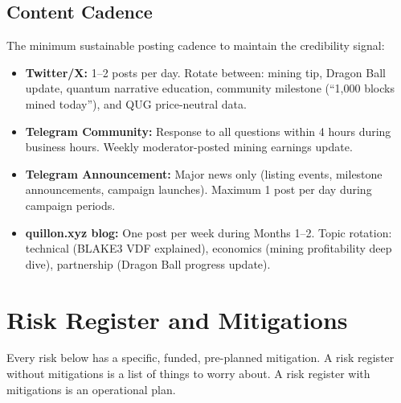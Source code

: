 \documentclass[11pt,a4paper]{article}
\begin{document}
\subsection{Content Cadence}

The minimum sustainable posting cadence to maintain the credibility signal:

\begin{itemize}[leftmargin=1.5em, itemsep=2pt]
  \item \textbf{Twitter/X:} 1--2 posts per day. Rotate between: mining tip, Dragon Ball update, quantum narrative education, community milestone (``1,000 blocks mined today''), and QUG price-neutral data.
  \item \textbf{Telegram Community:} Response to all questions within 4 hours during business hours. Weekly moderator-posted mining earnings update.
  \item \textbf{Telegram Announcement:} Major news only (listing events, milestone announcements, campaign launches). Maximum 1 post per day during campaign periods.
  \item \textbf{quillon.xyz blog:} One post per week during Months 1--2. Topic rotation: technical (BLAKE3 VDF explained), economics (mining profitability deep dive), partnership (Dragon Ball progress update).
\end{itemize}

\section{Risk Register and Mitigations}

Every risk below has a specific, funded, pre-planned mitigation. A risk register without mitigations is a list of things to worry about. A risk register with mitigations is an operational plan.
\end{document}
